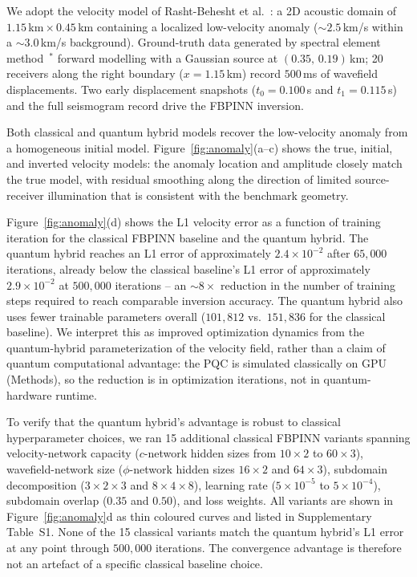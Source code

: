 \documentclass[11pt,a4paper]{article}
\newcommand{\newcite}[1]{\textcolor{todoRed}{$^{\ast}$}\citep{#1}}
\begin{document}
We adopt the velocity model of Rasht-Behesht et al.~\cite{rahst}: a 2D acoustic domain of $1.15$\,km\,$\times$\,$0.45$\,km containing a localized low-velocity anomaly ($\sim$$2.5$\,km/s within a $\sim$$3.0$\,km/s background). Ground-truth data generated by spectral element method~\newcite{komatitsch1998spectral} forward modelling with a Gaussian source at $(0.35,\,0.19)$\,km; 20 receivers along the right boundary ($x = 1.15$\,km) record $500$\,ms of wavefield displacements. Two early displacement snapshots ($t_0 = 0.100$\,s and $t_1 = 0.115$\,s) and the full seismogram record drive the FBPINN inversion.

Both classical and quantum hybrid models recover the low-velocity anomaly from a homogeneous initial model. Figure~\ref{fig:anomaly}(a--c) shows the true, initial, and inverted velocity models: the anomaly location and amplitude closely match the true model, with residual smoothing along the direction of limited source-receiver illumination that is consistent with the benchmark geometry.

Figure~\ref{fig:anomaly}(d) shows the L1 velocity error as a function of training iteration for the classical FBPINN baseline and the quantum hybrid. The quantum hybrid reaches an L1 error of approximately $2.4\times 10^{-2}$ after $65{,}000$ iterations, already below the classical baseline's L1 error of approximately $2.9\times 10^{-2}$ at $500{,}000$ iterations -- an $\sim$$8\times$ reduction in the number of training steps required to reach comparable inversion accuracy. The quantum hybrid also uses fewer trainable parameters overall ($101{,}812$ vs.\ $151{,}836$ for the classical baseline). We interpret this as improved optimization dynamics from the quantum-hybrid parameterization of the velocity field, rather than a claim of quantum computational advantage: the PQC is simulated classically on GPU (Methods), so the reduction is in optimization iterations, not in quantum-hardware runtime.

To verify that the quantum hybrid's advantage is robust to classical hyperparameter choices, we ran 15 additional classical FBPINN variants spanning velocity-network capacity ($c$-network hidden sizes from $10\!\times\!2$ to $60\!\times\!3$), wavefield-network size ($\phi$-network hidden sizes $16\!\times\!2$ and $64\!\times\!3$), subdomain decomposition ($3\!\times\!2\!\times\!3$ and $8\!\times\!4\!\times\!8$), learning rate ($5\!\times\!10^{-5}$ to $5\!\times\!10^{-4}$), subdomain overlap ($0.35$ and $0.50$), and loss weights. All variants are shown in Figure~\ref{fig:anomaly}d as thin coloured curves and listed in Supplementary Table~S1. None of the 15 classical variants match the quantum hybrid's L1 error at any point through $500{,}000$ iterations. The convergence advantage is therefore not an artefact of a specific classical baseline choice.
\end{document}
